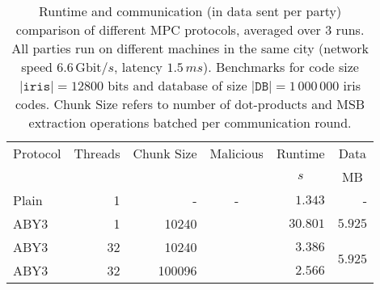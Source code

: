 \documentclass[a4paper,11pt,
]{article}
\newcommand{\xmark}{\ding{55}}%
\begin{document}
\begin{table}[ht]
    \centering
    \caption{Runtime and communication (in data sent per party) comparison of different MPC protocols, averaged over 3 runs. All parties run on different machines in the same city (network speed $6.6\,\text{Gbit}/s$, latency $1.5\,ms$). Benchmarks for code size $|\texttt{iris}| = 12800$ bits and database of size $|\texttt{DB}| = 1\,000\,000$ iris codes. Chunk Size refers to number of dot-products and MSB extraction operations batched per communication round.}
    \label{tab::bench_network_1m}
    \begin{tabular}{lrrcrr}
        \toprule
        \multicolumn{1}{c}{Protocol} & \multicolumn{1}{c}{Threads} & \multicolumn{1}{c}{Chunk Size} & \multicolumn{1}{c}{Malicious} & \multicolumn{1}{c}{Runtime} & \multicolumn{1}{c}{Data} \\
                                     &                             &                                &                               & \multicolumn{1}{c}{$s$}     & \multicolumn{1}{c}{MB}   \\
        \midrule
        Plain                        & 1                           & -                              & -                             & $1.343$                     & -                        \\
        ABY3                         & 1                           & 10240                          & \xmark                        & $30.801$                    & $5.925$                  \\
        \midrule
        ABY3                         & 32                          & 10240                          & \xmark                        & $3.386$                     & \multirow{2}{*}{$5.925$} \\
        ABY3                         & 32                          & 100096                         & \xmark                        & $2.566$                     &                          \\
        \bottomrule
    \end{tabular}
\end{table}
\end{document}
